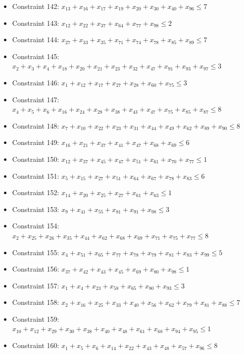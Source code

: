 \documentclass[11pt]{article}
\begin{document}
\begin{itemize}
\item Constraint 142: $x_{13} + x_{16} + x_{17} + x_{19} + x_{20} + x_{30} + x_{40} + x_{96} \le 7$
\item Constraint 143: $x_{12} + x_{22} + x_{37} + x_{64} + x_{77} + x_{98} \le 2$
\item Constraint 144: $x_{27} + x_{33} + x_{35} + x_{71} + x_{74} + x_{78} + x_{85} + x_{89} \le 7$
\item Constraint 145: $x_{2} + x_{3} + x_{4} + x_{18} + x_{20} + x_{21} + x_{23} + x_{32} + x_{47} + x_{91} + x_{93} + x_{97} \le 3$
\item Constraint 146: $x_{1} + x_{12} + x_{17} + x_{27} + x_{28} + x_{60} + x_{75} \le 3$
\item Constraint 147: $x_{4} + x_{5} + x_{6} + x_{16} + x_{24} + x_{28} + x_{38} + x_{43} + x_{47} + x_{75} + x_{85} + x_{87} \le 8$
\item Constraint 148: $x_{7} + x_{10} + x_{22} + x_{23} + x_{31} + x_{44} + x_{49} + x_{62} + x_{89} + x_{90} \le 8$
\item Constraint 149: $x_{16} + x_{21} + x_{37} + x_{41} + x_{47} + x_{68} + x_{69} \le 6$
\item Constraint 150: $x_{12} + x_{37} + x_{45} + x_{47} + x_{51} + x_{61} + x_{70} + x_{77} \le 1$
\item Constraint 151: $x_{5} + x_{15} + x_{27} + x_{51} + x_{64} + x_{67} + x_{78} + x_{83} \le 6$
\item Constraint 152: $x_{14} + x_{20} + x_{25} + x_{27} + x_{61} + x_{63} \le 1$
\item Constraint 153: $x_{9} + x_{41} + x_{55} + x_{81} + x_{91} + x_{98} \le 3$
\item Constraint 154: $x_{2} + x_{25} + x_{26} + x_{35} + x_{44} + x_{62} + x_{68} + x_{69} + x_{71} + x_{75} + x_{77} \le 8$
\item Constraint 155: $x_{4} + x_{51} + x_{65} + x_{77} + x_{78} + x_{79} + x_{81} + x_{83} + x_{99} \le 5$
\item Constraint 156: $x_{37} + x_{42} + x_{43} + x_{45} + x_{69} + x_{80} + x_{98} \le 1$
\item Constraint 157: $x_{1} + x_{4} + x_{23} + x_{58} + x_{65} + x_{80} + x_{93} \le 3$
\item Constraint 158: $x_{2} + x_{16} + x_{25} + x_{33} + x_{40} + x_{56} + x_{62} + x_{79} + x_{81} + x_{88} \le 7$
\item Constraint 159: $x_{10} + x_{12} + x_{29} + x_{30} + x_{38} + x_{40} + x_{48} + x_{61} + x_{68} + x_{94} + x_{95} \le 1$
\item Constraint 160: $x_{1} + x_{5} + x_{6} + x_{14} + x_{22} + x_{43} + x_{48} + x_{57} + x_{96} \le 8$

\end{itemize}
\end{document}
